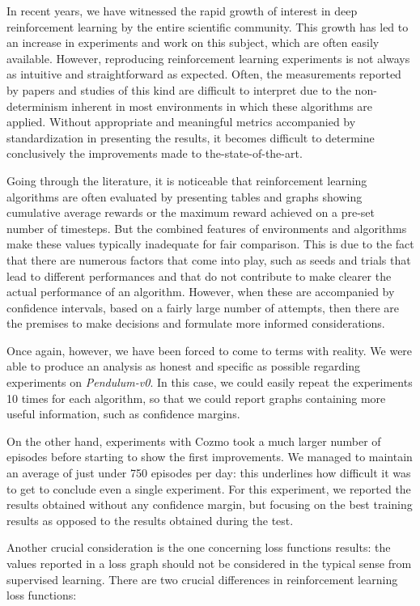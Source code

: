 In recent years, we have witnessed the rapid growth of interest in deep reinforcement learning by the entire scientific community.
This growth has led to an increase in experiments and work on this subject, which are often easily available.
However, reproducing reinforcement learning experiments is not always as intuitive and straightforward as expected.
Often, the measurements reported by papers and studies of this kind are difficult to interpret due to the non-determinism inherent in most environments in which these algorithms are applied.
Without appropriate and meaningful metrics accompanied by standardization in presenting the results, it becomes difficult to determine conclusively the improvements made to the-state-of-the-art.

Going through the literature, it is noticeable that reinforcement learning algorithms are often evaluated by presenting tables and graphs showing cumulative average rewards or the maximum reward achieved on a pre-set number of timesteps.
But the combined features of environments and algorithms make these values typically inadequate for fair comparison.
This is due to the fact that there are numerous factors that come into play, such as seeds and trials that lead to different performances and that do not contribute to make clearer the actual performance of an algorithm.
However, when these are accompanied by confidence intervals, based on a fairly large number of attempts, then there are the premises to make decisions and formulate more informed considerations.

Once again, however, we have been forced to come to terms with reality.
We were able to produce an analysis as honest and specific as possible regarding experiments on \textit{Pendulum-v0}.
In this case, we could easily repeat the experiments 10 times for each algorithm, so that we could report graphs containing more useful information, such as confidence margins.

On the other hand, experiments with Cozmo took a much larger number of episodes before starting to show the first improvements.
We managed to maintain an average of just under 750 episodes per day: this underlines how difficult it was to get to conclude even a single experiment.
For this experiment, we reported the results obtained without any confidence margin, but focusing on the best training results as opposed to the results obtained during the test.

Another crucial consideration is the one concerning loss functions results: the values reported in a loss graph should not be considered in the typical sense from supervised learning. There are two crucial differences in reinforcement learning loss functions:

